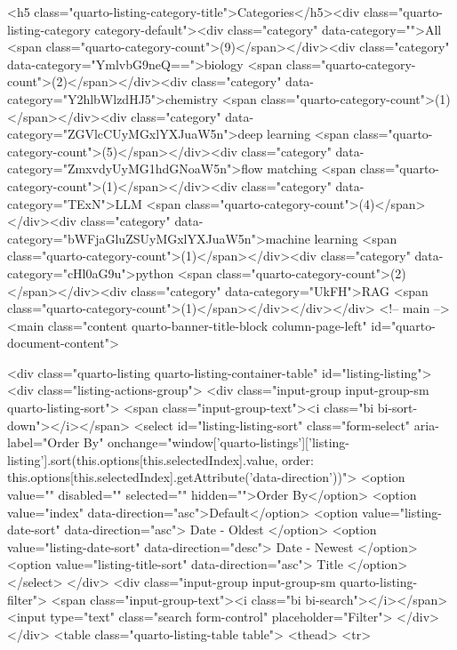     <h5 class="quarto-listing-category-title">Categories</h5><div class="quarto-listing-category category-default"><div class="category" data-category="">All <span class="quarto-category-count">(9)</span></div><div class="category" data-category="YmlvbG9neQ==">biology <span class="quarto-category-count">(2)</span></div><div class="category" data-category="Y2hlbWlzdHJ5">chemistry <span class="quarto-category-count">(1)</span></div><div class="category" data-category="ZGVlcCUyMGxlYXJuaW5n">deep learning <span class="quarto-category-count">(5)</span></div><div class="category" data-category="ZmxvdyUyMG1hdGNoaW5n">flow matching <span class="quarto-category-count">(1)</span></div><div class="category" data-category="TExN">LLM <span class="quarto-category-count">(4)</span></div><div class="category" data-category="bWFjaGluZSUyMGxlYXJuaW5n">machine learning <span class="quarto-category-count">(1)</span></div><div class="category" data-category="cHl0aG9u">python <span class="quarto-category-count">(2)</span></div><div class="category" data-category="UkFH">RAG <span class="quarto-category-count">(1)</span></div></div></div>
<!-- main -->
<main class="content quarto-banner-title-block column-page-left" id="quarto-document-content">









<div class="quarto-listing quarto-listing-container-table" id="listing-listing">
<div class="listing-actions-group">
   <div class="input-group input-group-sm quarto-listing-sort">
    <span class="input-group-text"><i class="bi bi-sort-down"></i></span>
    <select id="listing-listing-sort" class="form-select" aria-label="Order By" onchange="window['quarto-listings']['listing-listing'].sort(this.options[this.selectedIndex].value, { order: this.options[this.selectedIndex].getAttribute('data-direction')})">
      <option value="" disabled="" selected="" hidden="">Order By</option>
      <option value="index" data-direction="asc">Default</option>
      <option value="listing-date-sort" data-direction="asc">
        Date - Oldest
      </option>
      <option value="listing-date-sort" data-direction="desc">
        Date - Newest
      </option>
      <option value="listing-title-sort" data-direction="asc">
        Title
      </option>
    </select>
  </div>
    <div class="input-group input-group-sm quarto-listing-filter">
      <span class="input-group-text"><i class="bi bi-search"></i></span>
      <input type="text" class="search form-control" placeholder="Filter">
    </div>
</div>
<table class="quarto-listing-table table">
<thead>
<tr>

